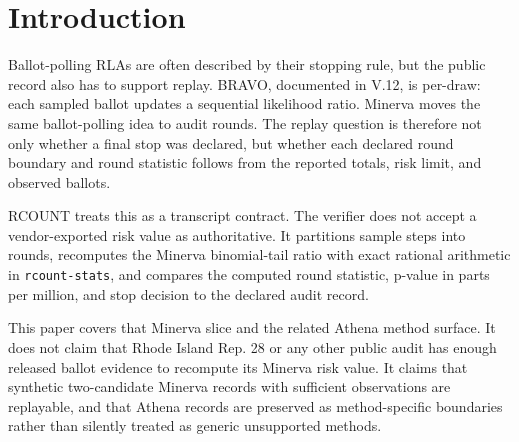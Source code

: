 \section{Introduction}

Ballot-polling RLAs are often described by their stopping rule, but the public
record also has to support replay. BRAVO, documented in V.12, is per-draw:
each sampled ballot updates a sequential likelihood ratio. Minerva moves the
same ballot-polling idea to audit rounds. The replay question is therefore not
only whether a final stop was declared, but whether each declared round boundary
and round statistic follows from the reported totals, risk limit, and observed
ballots.

RCOUNT treats this as a transcript contract. The verifier does not accept a
vendor-exported risk value as authoritative. It partitions sample steps into
rounds, recomputes the Minerva binomial-tail ratio with exact rational
arithmetic in \texttt{rcount-stats}, and compares the computed round statistic,
p-value in parts per million, and stop decision to the declared audit record.

This paper covers that Minerva slice and the related Athena method surface.
It does not claim that Rhode Island Rep. 28 or any other public audit has
enough released ballot evidence to recompute its Minerva risk value. It claims
that synthetic two-candidate Minerva records with sufficient observations are
replayable, and that Athena records are preserved as method-specific boundaries
rather than silently treated as generic unsupported methods.
